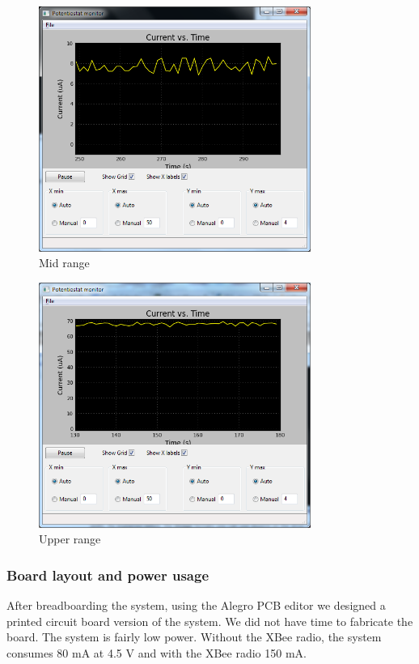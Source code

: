 \begin{figure}[h]
\begin{center}
\includegraphics[width=3.5in]{../figures/1Mohm_8uA_680KOhm.png}
\end{center}
\caption{Mid range}
\label{fig:sys_test_mid}
\end{figure}

\begin{figure}[h]
\begin{center}
\includegraphics[width=3.5in]{../figures/10KOhm_70uA_39KOhm.png}
\end{center}
\caption{Upper range}
\label{fig:sys_test_up}
\end{figure}

\subsubsection{Board layout and power usage}
After breadboarding the system, using the Alegro PCB editor we designed a printed circuit board version of the system. We did not have time to fabricate the board. The system is fairly low power. Without the XBee radio, the system consumes 80 mA at 4.5 V and with the XBee radio 150 mA.

